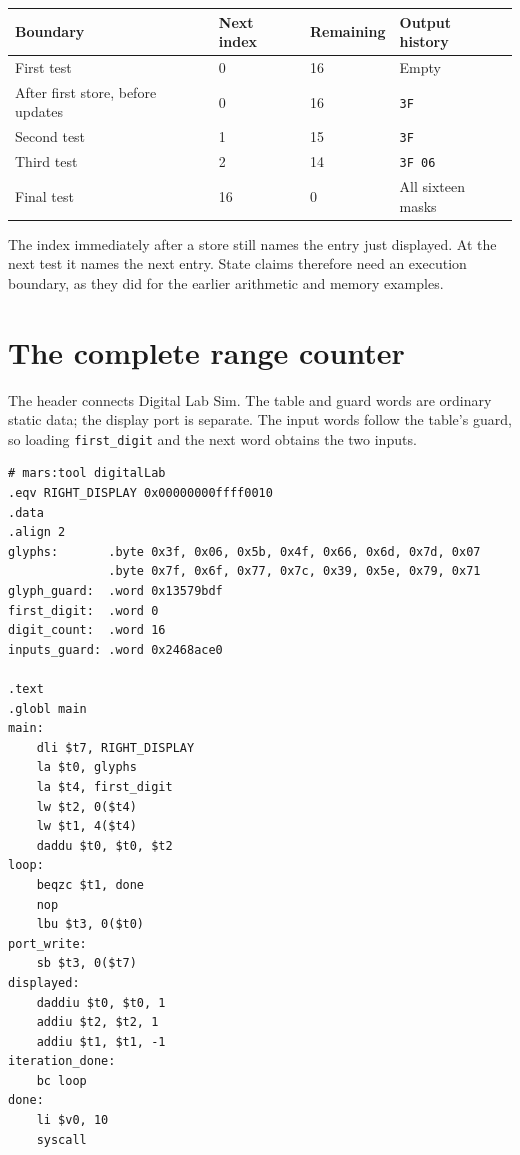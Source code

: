 \begin{center}
  \begin{tabular}{llll}
    \toprule
    Boundary                          & Next index & Remaining & Output history    \\
    \midrule
    First test                        & 0          & 16        & Empty             \\
    After first store, before updates & 0          & 16        & \texttt{3F}       \\
    Second test                       & 1          & 15        & \texttt{3F}       \\
    Third test                        & 2          & 14        & \texttt{3F 06}    \\
    Final test                        & 16         & 0         & All sixteen masks \\
    \bottomrule
  \end{tabular}
\end{center}

The index immediately after a store still names the entry just displayed. At the
next test it names the next entry. State claims therefore need an execution
boundary, as they did for the earlier arithmetic and memory examples.

\section{The complete range counter}

The header connects Digital Lab Sim. The table and guard words are ordinary
static data; the display port is separate. The input words follow the table's
guard, so loading \texttt{first\_digit} and the next word obtains the two inputs.

\begin{verbatim}
# mars:tool digitalLab
.eqv RIGHT_DISPLAY 0x00000000ffff0010
.data
.align 2
glyphs:       .byte 0x3f, 0x06, 0x5b, 0x4f, 0x66, 0x6d, 0x7d, 0x07
              .byte 0x7f, 0x6f, 0x77, 0x7c, 0x39, 0x5e, 0x79, 0x71
glyph_guard:  .word 0x13579bdf
first_digit:  .word 0
digit_count:  .word 16
inputs_guard: .word 0x2468ace0

.text
.globl main
main:
    dli $t7, RIGHT_DISPLAY
    la $t0, glyphs
    la $t4, first_digit
    lw $t2, 0($t4)
    lw $t1, 4($t4)
    daddu $t0, $t0, $t2
loop:
    beqzc $t1, done
    nop
    lbu $t3, 0($t0)
port_write:
    sb $t3, 0($t7)
displayed:
    daddiu $t0, $t0, 1
    addiu $t2, $t2, 1
    addiu $t1, $t1, -1
iteration_done:
    bc loop
done:
    li $v0, 10
    syscall
\end{verbatim}

